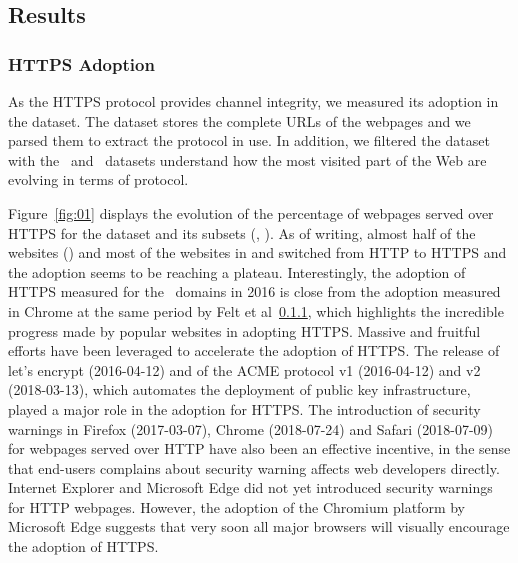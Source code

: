 \documentclass[sigconf,table]{acmart}
\begin{document}






\subsection{Results}

\subsubsection{HTTPS Adoption}

As the HTTPS protocol provides channel integrity, we measured its adoption in the \CC dataset.
The \CC dataset stores the complete URLs of the webpages and we parsed them to extract the protocol in use.
In addition, we filtered the \CC dataset with the \TopK\ and \TopM\ datasets understand how the most visited part of the Web are evolving in terms of protocol.

Figure~\ref{fig:01} displays the evolution of the percentage of webpages served over HTTPS for the \CC dataset and its subsets (\TopM, \TopK).
As of writing, almost half of the websites (\CCUrlHttpsP) and most of the websites in \TopK and \TopM switched from HTTP to HTTPS and the adoption seems to be reaching a plateau.
Interestingly, the adoption of HTTPS measured for the \TopK\ domains in 2016 is close from the adoption measured in Chrome at the same period by Felt et al~\ref{}, which highlights the incredible progress made by popular websites in adopting HTTPS.
Massive and fruitful efforts have been leveraged to accelerate the adoption of HTTPS.
The release of let's encrypt (2016-04-12) and of the ACME protocol v1 (2016-04-12) and v2 (2018-03-13), which automates the deployment of public key infrastructure, played a major role in the adoption for HTTPS.
The introduction of security warnings in Firefox (2017-03-07), Chrome (2018-07-24) and Safari (2018-07-09) for webpages served over HTTP have also been an effective incentive, in the sense that end-users complains about security warning affects web developers directly.
Internet Explorer and Microsoft Edge did not yet introduced security warnings for HTTP webpages.
However, the adoption of the Chromium platform by Microsoft Edge suggests that very soon all major browsers will visually encourage the adoption of HTTPS.
\end{document}
